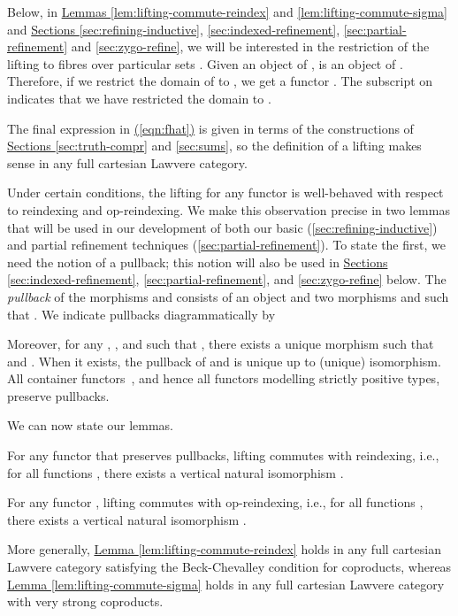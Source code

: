 \documentclass{LMCS}
\newcommand{\parenref}[1]{\hyperref[#1]{(\ref*{#1})}}
\newcommand{\lemref}[1]{\hyperref[#1]{Lemma \ref*{#1}}}
\begin{document}
Below, in \hyperref[lem:lifting-commute-reindex]{Lemmas
  \ref*{lem:lifting-commute-reindex}} and
\ref{lem:lifting-commute-sigma} and
\hyperref[sec:refining-inductive]{Sections
  \ref*{sec:refining-inductive}}, \ref{sec:indexed-refinement},
\ref{sec:partial-refinement} and \ref{sec:zygo-refine}, we will be
interested in the restriction of the lifting  to fibres over
particular sets . Given an object  of ,
 is an object of . Therefore, if we
restrict the domain of  to , we get a functor
. The subscript  on
 indicates that we have restricted the domain to
.

The final expression in \parenref{eqn:fhat} is given in terms of the
constructions of \hyperref[sec:truth-compr]{Sections
  \ref*{sec:truth-compr}} and \hyperref[sec:sums]{ \ref*{sec:sums}},
so the definition of a lifting makes sense in any full cartesian
Lawvere category.

Under certain conditions, the lifting  for any functor  is
well-behaved with respect to reindexing and op-reindexing. We make
this observation precise in two lemmas that will be used in our
development of both our basic (\autoref{sec:refining-inductive}) and
partial refinement techniques (\autoref{sec:partial-refinement}). To
state the first, we need the notion of a pullback; this notion will
also be used in \hyperref[sec:indexed-refinement]{Sections
  \ref*{sec:indexed-refinement}}, \hyperref[sec:partial-refinement]{
  \ref*{sec:partial-refinement}}, and \hyperref[sec:zygo-refine]{
  \ref*{sec:zygo-refine}} below. The {\em pullback} of the morphisms
 and  consists of an object  and two
morphisms  and  such that .  We indicate pullbacks diagrammatically by

Moreover, for any , , and  such that
, there exists a unique morphism  such that  and .  When it exists,
the pullback of  and  is unique up to (unique) isomorphism.  All
container functors~\cite{DBLP:conf/fossacs/AbbottAG03}, and hence all
functors modelling strictly positive types, preserve pullbacks.

We can now state our lemmas.

\begin{lem}\label{lem:lifting-commute-reindex}
  For any functor  that preserves pullbacks,
  lifting commutes with reindexing, i.e., for all functions , there exists a vertical natural isomorphism .
\end{lem}

\begin{lem}\label{lem:lifting-commute-sigma}
  For any functor , lifting commutes with
  op-reindexing, i.e., for all functions , there exists a
  vertical natural isomorphism .
\end{lem}
\noindent
More generally, \lemref{lem:lifting-commute-reindex} holds in any full
cartesian Lawvere category satisfying the Beck-Chevalley condition for
coproducts, whereas \lemref{lem:lifting-commute-sigma} holds in any
full cartesian Lawvere category with very strong coproducts.
\end{document}
